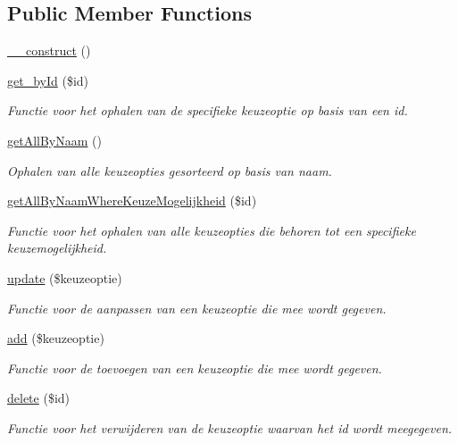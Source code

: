 \subsection*{Public Member Functions}
\begin{DoxyCompactItemize}
\item 
\mbox{\hyperlink{class_keuzeoptie___model_a095c5d389db211932136b53f25f39685}{\+\_\+\+\_\+construct}} ()
\item 
\mbox{\hyperlink{class_keuzeoptie___model_a98d28a4d9a29d40c5a8aa0176f19a919}{get\+\_\+by\+Id}} (\$id)
\begin{DoxyCompactList}\small\item\em Functie voor het ophalen van de specifieke keuzeoptie op basis van een id. \end{DoxyCompactList}\item 
\mbox{\hyperlink{class_keuzeoptie___model_a2b035b1ffd1cbe651b35bb3e53d72c09}{get\+All\+By\+Naam}} ()
\begin{DoxyCompactList}\small\item\em Ophalen van alle keuzeopties gesorteerd op basis van naam. \end{DoxyCompactList}\item 
\mbox{\hyperlink{class_keuzeoptie___model_a6f3e4d26ab480501524eabb01683f5f7}{get\+All\+By\+Naam\+Where\+Keuze\+Mogelijkheid}} (\$id)
\begin{DoxyCompactList}\small\item\em Functie voor het ophalen van alle keuzeopties die behoren tot een specifieke keuzemogelijkheid. \end{DoxyCompactList}\item 
\mbox{\hyperlink{class_keuzeoptie___model_a9d98d1a6c3919a0e7b946d37fa385948}{update}} (\$keuzeoptie)
\begin{DoxyCompactList}\small\item\em Functie voor de aanpassen van een keuzeoptie die mee wordt gegeven. \end{DoxyCompactList}\item 
\mbox{\hyperlink{class_keuzeoptie___model_a2452f524e794bc3f418d60cb296e19b5}{add}} (\$keuzeoptie)
\begin{DoxyCompactList}\small\item\em Functie voor de toevoegen van een keuzeoptie die mee wordt gegeven. \end{DoxyCompactList}\item 
\mbox{\hyperlink{class_keuzeoptie___model_a2f8258add505482d7f00ea26493a5723}{delete}} (\$id)
\begin{DoxyCompactList}\small\item\em Functie voor het verwijderen van de keuzeoptie waarvan het id wordt meegegeven. \end{DoxyCompactList}\end{DoxyCompactItemize}


